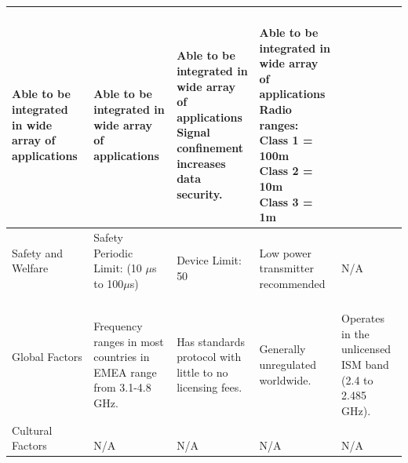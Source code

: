 \documentclass[12pt]{article}
\begin{document}
\begin{table}[h!]
\begin{tabular}{| l | l | l | l | l |}
\parbox{0.180\linewidth}{\hfill \\
Able to be integrated in wide array of applications
\\} & 
\parbox{0.180\linewidth}{\hfill \\
Able to be integrated in wide array of applications
\\} & 
\parbox{0.180\linewidth}{\hfill \\
Able to be integrated in wide array of applications\\
Signal confinement increases data security.
\\} & \parbox{0.180\linewidth}{\hfill \\
Able to be integrated in wide array of applications\\
Radio ranges:\\ Class 1 = 100m\\ Class 2 = 10m\\ Class 3 = 1m
\\}\\ \hline
\parbox{0.17\linewidth}{\raggedleft Safety and Welfare} & 
\parbox{0.180\linewidth}{\hfill \\
Safety Periodic Limit: (10 $\mu$s to 100$\mu$s)
\\} & 
\parbox{0.180\linewidth}{\hfill \\
Device Limit: 50
\\} & 
\parbox{0.180\linewidth}{\hfill \\
Low power transmitter recommended
\\} & \parbox{0.180\linewidth}{\hfill \\
N/A
\\}\\ \hline
\parbox{0.17\linewidth}{\raggedleft Global Factors} & 
\parbox{0.180\linewidth}{\hfill \\
Frequency ranges in most countries in EMEA range from 3.1-4.8 GHz.
\\} & 
\parbox{0.180\linewidth}{\hfill \\
Has standards protocol with little to no licensing fees.
\\} & 
\parbox{0.180\linewidth}{\hfill \\
Generally unregulated worldwide.
\\} & \parbox{0.180\linewidth}{\hfill \\
Operates in the unlicensed ISM band (2.4 to 2.485 GHz).
\\}\\ \hline
\parbox{0.17\linewidth}{\raggedleft Cultural Factors} & 
\parbox{0.180\linewidth}{\hfill \\
N/A
\\} & 
\parbox{0.180\linewidth}{\hfill \\
N/A
\\} & 
\parbox{0.180\linewidth}{\hfill \\
N/A
\\} & \parbox{0.180\linewidth}{\hfill \\
N/A
\\}\\ \hline
\end{tabular}
\end{table}
\end{document}
